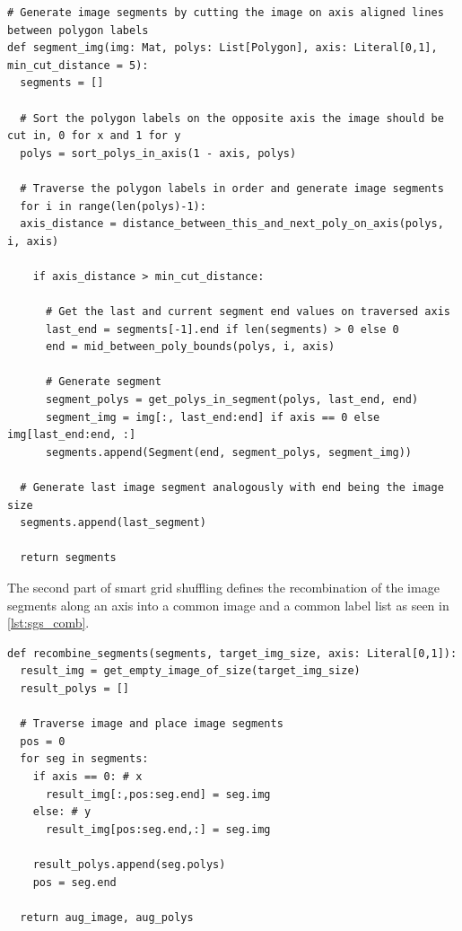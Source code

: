 \documentclass[10pt]{book}
\newenvironment{code}{\captionsetup{type=listing}}{}
\begin{document}
\begin{code}
\label{lst:sgs_cut}
\begin{verbatim}
# Generate image segments by cutting the image on axis aligned lines between polygon labels
def segment_img(img: Mat, polys: List[Polygon], axis: Literal[0,1], min_cut_distance = 5):
  segments = []
  
  # Sort the polygon labels on the opposite axis the image should be cut in, 0 for x and 1 for y
  polys = sort_polys_in_axis(1 - axis, polys)
  
  # Traverse the polygon labels in order and generate image segments
  for i in range(len(polys)-1):
  axis_distance = distance_between_this_and_next_poly_on_axis(polys, i, axis)

    if axis_distance > min_cut_distance:

      # Get the last and current segment end values on traversed axis 
      last_end = segments[-1].end if len(segments) > 0 else 0
      end = mid_between_poly_bounds(polys, i, axis)

      # Generate segment
      segment_polys = get_polys_in_segment(polys, last_end, end)
      segment_img = img[:, last_end:end] if axis == 0 else img[last_end:end, :]
      segments.append(Segment(end, segment_polys, segment_img))

  # Generate last image segment analogously with end being the image size
  segments.append(last_segment)
  
  return segments
\end{verbatim}
\end{code}

The second part of smart grid shuffling defines the recombination of the image segments along an axis into a common image and a common label list as seen in \autoref{lst:sgs_comb}.

\begin{code}
\label{lst:sgs_comb}
\begin{verbatim}
def recombine_segments(segments, target_img_size, axis: Literal[0,1]):
  result_img = get_empty_image_of_size(target_img_size)
  result_polys = []

  # Traverse image and place image segments
  pos = 0
  for seg in segments:
    if axis == 0: # x
      result_img[:,pos:seg.end] = seg.img
    else: # y
      result_img[pos:seg.end,:] = seg.img
        
    result_polys.append(seg.polys)
    pos = seg.end
    
  return aug_image, aug_polys
\end{verbatim}
\end{code}
\end{document}

